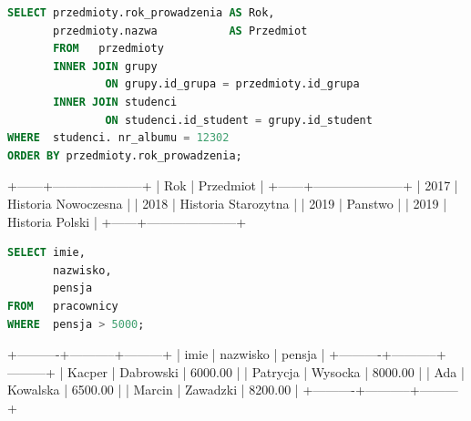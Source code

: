 \documentclass[12pt,a4paper]{article}
\newenvironment{sqltable}%
{\snugshade\verbatim}%
{\endverbatim\endsnugshade}
\begin{document}
\begin{lstlisting}[language=SQL]
SELECT przedmioty.rok_prowadzenia AS Rok,
       przedmioty.nazwa           AS Przedmiot
       FROM   przedmioty
       INNER JOIN grupy
               ON grupy.id_grupa = przedmioty.id_grupa
       INNER JOIN studenci
               ON studenci.id_student = grupy.id_student
WHERE  studenci. nr_albumu = 12302
ORDER BY przedmioty.rok_prowadzenia; 
\end{lstlisting}

\begin{sqltable}
+------+---------------------+
| Rok  | Przedmiot           |
+------+---------------------+
| 2017 | Historia Nowoczesna |
| 2018 | Historia Starozytna |
| 2019 | Panstwo             |
| 2019 | Historia Polski     |
+------+---------------------+
\end{sqltable}

\begin{lstlisting}[language=SQL]
SELECT imie, 
       nazwisko, 
       pensja 
FROM   pracownicy 
WHERE  pensja > 5000; 
\end{lstlisting}
\begin{sqltable}
+----------+-----------+---------+
| imie     | nazwisko  | pensja  |
+----------+-----------+---------+
| Kacper   | Dabrowski | 6000.00 |
| Patrycja | Wysocka   | 8000.00 |
| Ada      | Kowalska  | 6500.00 |
| Marcin   | Zawadzki  | 8200.00 |
+----------+-----------+---------+
\end{sqltable}

\noindent



\nocite{*}
\end{document}
